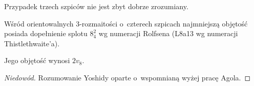 Przypadek trzech szpiców nie jest zbyt dobrze zrozumiany.
%

\begin{proposition}
    Wśród orientowalnych 3-rozmaitości o~czterech szpicach najmniejszą objętość posiada dopełnienie splotu $8_4^2$ wg numeracji Rolfsena (L8a13 wg numeracji Thistlethwaite'a).
%
\end{proposition}

Jego objętość wynosi $2v_8$.

\begin{proof}[Niedowód]
%
    Rozumowanie Yoshidy \cite{yoshida2013} oparte o~wspomnianą wyżej pracę Agola.
\end{proof}

%

